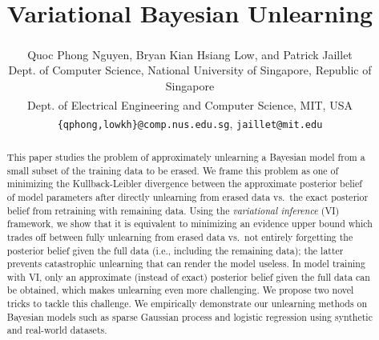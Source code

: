\documentclass{article}
\title{Variational Bayesian Unlearning}
\author{%
  Quoc Phong Nguyen, Bryan Kian Hsiang Low, and Patrick Jaillet\textsuperscript{\dag}\\
  Dept. of Computer Science, National University of Singapore, Republic of Singapore\\
  Dept. of Electrical Engineering and Computer Science, MIT, USA\textsuperscript{\dag}\\
  \texttt{\{qphong,lowkh\}@comp.nus.edu.sg}, \texttt{jaillet@mit.edu}\textsuperscript{\dag}
}
\theoremstyle{definition}
\newcommand{\todo}[1]{}
\begin{document}
\maketitle

\begin{abstract}
This paper studies the problem of approximately unlearning a Bayesian model from a small subset of the training data to be erased. We frame this problem as one of minimizing the Kullback-Leibler divergence between the approximate posterior belief of model parameters after directly unlearning from erased data vs.~the exact posterior belief from retraining with remaining data. Using the \emph{variational inference} (VI) framework, we show that it is equivalent to minimizing an evidence upper bound which trades off between fully unlearning from erased data vs.~not entirely forgetting the posterior belief given the full data (i.e., including the remaining data); the latter prevents catastrophic unlearning that can render the model useless. In model training with VI, only an approximate (instead of exact) posterior belief given the full data can be obtained, which makes unlearning even more challenging. We propose two novel tricks to tackle this challenge. We empirically demonstrate our unlearning methods on Bayesian models such as sparse Gaussian process and logistic regression using synthetic and real-world datasets.%
\end{abstract}

\todo{measure -> criterion ->  the existence of the opposite -> leads to learn vs unlearn (ELBO vs EUBO)}
\end{document}
